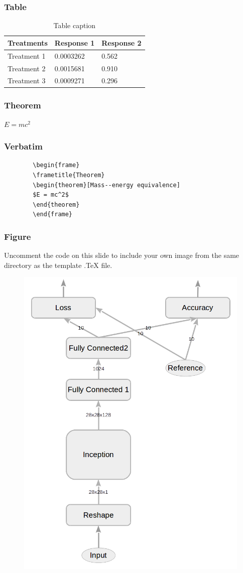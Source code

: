 \documentclass{beamer}
\begin{document}
\begin{frame}
	\frametitle{Table}
	\begin{table}
		\begin{tabular}{l l l}
			\toprule
			\textbf{Treatments} & \textbf{Response 1} & \textbf{Response 2}\\
			\midrule
			Treatment 1 & 0.0003262 & 0.562 \\
			Treatment 2 & 0.0015681 & 0.910 \\
			Treatment 3 & 0.0009271 & 0.296 \\
			\bottomrule
		\end{tabular}
		\caption{Table caption}
	\end{table}
\end{frame}

\begin{frame}
	\frametitle{Theorem}
	\begin{theorem}
		$E = mc^2$
	\end{theorem}
\end{frame}

\begin{frame}[fragile] %
	\frametitle{Verbatim}
	\begin{example}
		\begin{verbatim}
		\begin{frame}
		\frametitle{Theorem}
		\begin{theorem}[Mass--energy equivalence]
		$E = mc^2$
		\end{theorem}
		\end{frame}\end{verbatim}
	\end{example}
\end{frame}

\begin{frame}
	\frametitle{Figure}
	Uncomment the code on this slide to include your own image from the same directory as the template .TeX file.
	\begin{figure}
		\includegraphics[width=0.4\linewidth]{images/main_graph_inception_reduced.png}
	\end{figure}
\end{frame}
\end{document}
